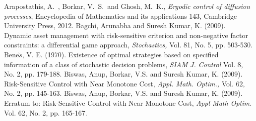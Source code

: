 \documentclass[11pt]{amsart}
\numberwithin{equation}{section}
\begin{document}
\begin{thebibliography}{99}
 Arapostathis, A.\ , Borkar, V.\ S.\ and  Ghosh, M.\ K., {\it Ergodic control of diffusion processes}, Encyclopedia of Mathematics and its applications 143, Cambridge University Press, 2012.
Bagchi, Arunabha and Suresh Kumar, K. (2009). Dynamic asset management with risk-sensitive criterion and non-negative
factor constraints: a differential game approach, {\it Stochastics,} Vol. 81, No. 5, pp. 503-530.
Bene$\breve{s}$, V. E. (1970). Existence of optimal strategies based on specified 
information of a class of stochastic decision problems, {\it SIAM J. Control} Vol. 8, No. 2, pp. 179-188.
Biswas, Anup, Borkar, V.S. and Suresh Kumar, K. (2009). Risk-Sensitive Control with Near Monotone Cost, {\it Appl. Math. Optim.,} Vol. 62, No. 2, pp. 145-163. 
Biswas, Anup, Borkar, V.S. and Suresh Kumar, K. (2009). Erratum to: Risk-Sensitive Control
with Near Monotone Cost, {\it Appl Math Optim.} Vol. 62, No. 2, pp. 165-167.


\end{thebibliography}
\end{document}
